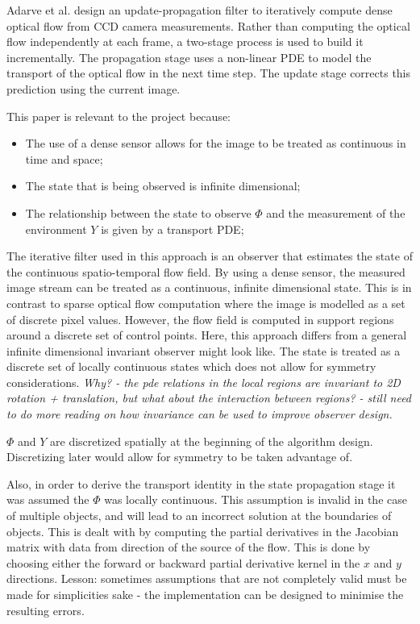 Adarve et al. design an update-propagation filter to iteratively compute dense optical flow from CCD camera measurements. Rather than computing the optical flow independently at each frame, a two-stage process is used to build it incrementally. The propagation stage uses a non-linear PDE to model the transport of the optical flow in the next time step. The update stage corrects this prediction using the current image.

This paper is relevant to the project because:
\begin{itemize}
\item The use of a dense sensor allows for the image to be treated as continuous in time and space;
\item The state that is being observed is infinite dimensional;
\item The relationship between the state to observe $ \Phi $ and the measurement of the environment $ Y $ is given by a transport PDE;
\end{itemize}

The iterative filter used in this approach is an observer that estimates the state of the continuous spatio-temporal flow field. By using a dense sensor, the measured image stream can be treated as a continuous, infinite dimensional state. This is in contrast to sparse optical flow computation where the image is modelled as a set of discrete pixel values. However, the flow field is computed in support regions around a discrete set of control points. Here, this approach differs from a general infinite dimensional invariant observer might look like. The state is treated as a discrete set of locally continuous states which does not allow for symmetry considerations. \textit{Why? - the pde relations in the local regions are invariant to 2D rotation + translation, but what about the interaction between regions? - still need to do more reading on how invariance can be used to improve observer design.}

$\Phi$ and $Y$ are discretized spatially at the beginning of the algorithm design. Discretizing later would allow for symmetry to be taken advantage of.

Also, in order to derive the transport identity in the state propagation stage it was assumed the $\Phi$ was locally continuous. This assumption is invalid in the case of multiple objects, and will lead to an incorrect solution at the boundaries of objects. This is dealt with by computing the partial derivatives in the Jacobian matrix with data from direction of the source of the flow. This is done by choosing either the forward or backward partial derivative kernel in the $x$ and $y$ directions. Lesson: sometimes assumptions that are not completely valid must be made for simplicities sake - the implementation can be designed to minimise the resulting errors.



